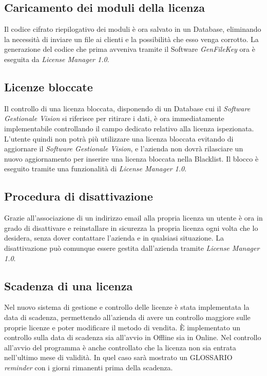 \subsection{Caricamento dei moduli della licenza}

Il codice cifrato riepilogativo dei moduli è ora salvato in un Database, eliminando la necessità di inviare un file ai clienti e la possibilità che esso venga corrotto. La generazione del codice che prima avveniva tramite il Software \textit{GenFileKey} ora è eseguita da \textit{License Manager 1.0}.

\subsection{Licenze bloccate} 
Il controllo di una licenza bloccata, disponendo di un Database cui il \textit{Software Gestionale Vision} si riferisce per ritirare i dati, è ora immediatamente implementabile controllando il campo dedicato relativo alla licenza ispezionata. L'utente quindi non potrà più utilizzare una licenza bloccata evitando di aggiornare il \textit{Software Gestionale Vision}, e l'azienda non dovrà rilasciare un nuovo aggiornamento per inserire una licenza bloccata nella Blacklist.
Il blocco è eseguito tramite una funzionalità di \textit{License Manager 1.0}.

\subsection{Procedura di disattivazione}

Grazie all'associazione di un indirizzo email alla propria licenza un utente è ora in grado di disattivare e reinstallare in sicurezza la propria licenza ogni volta che lo desidera, senza dover contattare l’azienda e in qualsiasi situazione. La disattivazione può comunque essere gestita dall'azienda tramite \textit{License Manager 1.0}.

\subsection{Scadenza di una licenza}

Nel nuovo sistema di gestione e controllo delle licenze è stata implementata la data di scadenza, permettendo all'azienda di avere un controllo maggiore sulle proprie licenze e poter modificare il metodo di vendita. È implementato un controllo sulla data di scadenza sia all'avvio in Offline sia in Online. Nel controllo all’avvio del programma è anche controllato che la licenza non sia entrata nell’ultimo mese di validità. In quel caso sarà mostrato un GLOSSARIO \textit{reminder} con i giorni rimanenti prima della scadenza. 
 
